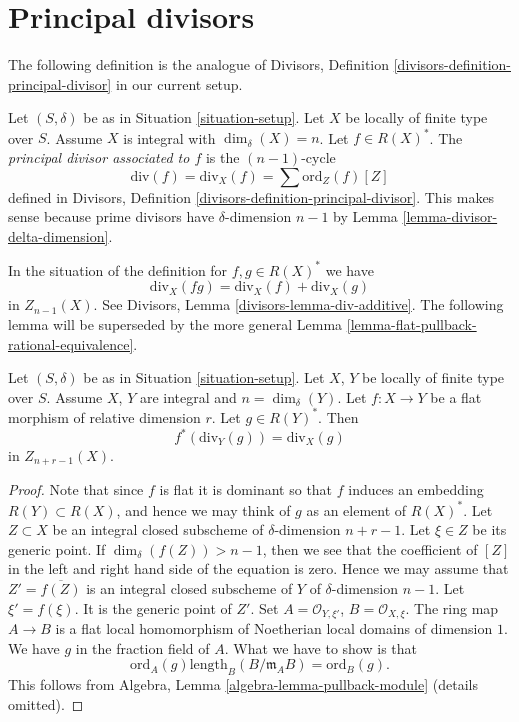 \section{Principal divisors}
\label{section-principal-divisors}

\noindent
The following definition is the analogue of
Divisors, Definition \ref{divisors-definition-principal-divisor}
in our current setup.

\begin{definition}
\label{definition-principal-divisor}
Let $(S, \delta)$ be as in Situation \ref{situation-setup}.
Let $X$ be locally of finite type over $S$. Assume $X$ is
integral with $\dim_\delta(X) = n$.
Let $f \in R(X)^*$. The {\it principal divisor
associated to $f$} is the $(n - 1)$-cycle
$$
\text{div}(f) = \text{div}_X(f) = \sum \text{ord}_Z(f) [Z]
$$
defined in Divisors, Definition \ref{divisors-definition-principal-divisor}.
This makes sense because prime divisors have $\delta$-dimension $n - 1$ by
Lemma \ref{lemma-divisor-delta-dimension}.
\end{definition}

\noindent
In the situation of the definition for $f, g \in R(X)^*$ we have
$$
\text{div}_X(fg) = \text{div}_X(f) + \text{div}_X(g)
$$
in $Z_{n - 1}(X)$. See Divisors, Lemma \ref{divisors-lemma-div-additive}.
The following lemma will be superseded by the more general
Lemma \ref{lemma-flat-pullback-rational-equivalence}.

\begin{lemma}
\label{lemma-flat-pullback-principal-divisor}
Let $(S, \delta)$ be as in Situation \ref{situation-setup}.
Let $X$, $Y$ be locally of finite type over $S$. Assume $X$, $Y$
are integral and $n = \dim_\delta(Y)$.
Let $f : X \to Y$ be a flat morphism of relative dimension $r$.
Let $g \in R(Y)^*$. Then
$$
f^*(\text{div}_Y(g)) = \text{div}_X(g)
$$
in $Z_{n + r - 1}(X)$.
\end{lemma}

\begin{proof}
Note that since $f$ is flat it is dominant so that
$f$ induces an embedding $R(Y) \subset R(X)$, and hence
we may think of $g$ as an element of $R(X)^*$.
Let $Z \subset X$ be an integral closed subscheme of
$\delta$-dimension $n + r - 1$. Let $\xi \in Z$
be its generic point. If $\dim_\delta(f(Z)) > n - 1$,
then we see that the coefficient of $[Z]$ in the left and
right hand side of the equation is zero.
Hence we may assume that $Z' = \overline{f(Z)}$ is an
integral closed subscheme of $Y$ of $\delta$-dimension $n - 1$.
Let $\xi' = f(\xi)$. It is the generic point of $Z'$.
Set $A = \mathcal{O}_{Y, \xi'}$, $B = \mathcal{O}_{X, \xi}$.
The ring map $A \to B$ is a flat local homomorphism of
Noetherian local domains of dimension $1$.
We have $g$ in the fraction field of $A$. What we have to show is that
$$
\text{ord}_A(g) \text{length}_B(B/\mathfrak m_AB)
=
\text{ord}_B(g).
$$
This follows from Algebra, Lemma \ref{algebra-lemma-pullback-module}
(details omitted).
\end{proof}











